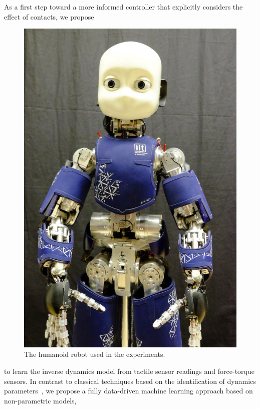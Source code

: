 As a first step toward a more informed controller that explicitly considers the effect of contacts, we propose 
%
\begin{figure}
	\centering
	\includegraphics[width=.99\linewidth]{fig/iCubDarmstadt01}
	\caption{The humanoid robot \robot{} used in the experiments.}
	\label{fig:icub}
	\figspace
\end{figure}
%
to learn the inverse dynamics model from tactile sensor readings and force-torque sensors. 
%
In contrast to classical techniques based on the identification of dynamics parameters~\cite{Yamane2011calibration,Ogawa2014,traversaro2013inertial},
we propose a fully data-driven machine learning approach based on non-parametric models,
